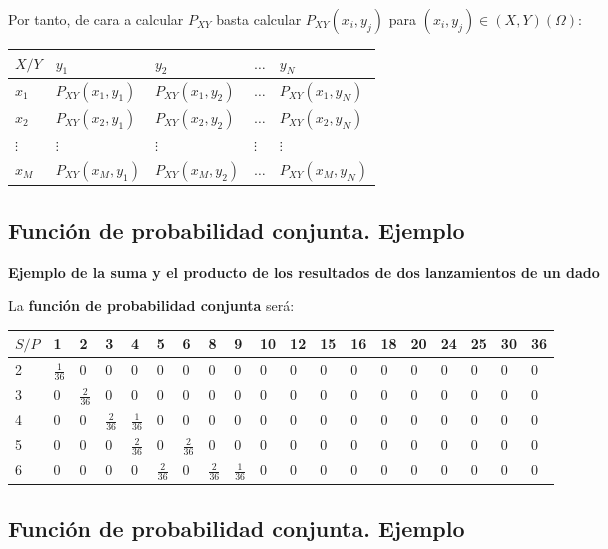 \documentclass[]{book}
\begin{document}
Por tanto, de cara a calcular \(P_{XY}\) basta calcular \(P_{XY}(x_i,y_j)\) para \((x_i,y_j)\in (X,Y)(\Omega)\):

\begin{longtable}[]{@{}lllll@{}}
\toprule
\(X/Y\) & \(y_1\) & \(y_2\) & \(\ldots\) & \(y_N\)\tabularnewline
\midrule
\endhead
\(x_1\) & \(P_{XY}(x_1,y_1)\) & \(P_{XY}(x_1,y_2)\) & \(\ldots\) & \(P_{XY}(x_1,y_N)\)\tabularnewline
\(x_2\) & \(P_{XY}(x_2,y_1)\) & \(P_{XY}(x_2,y_2)\) & \(\ldots\) & \(P_{XY}(x_2,y_N)\)\tabularnewline
\(\vdots\) & \(\vdots\) & \(\vdots\) & \(\vdots\) & \(\vdots\)\tabularnewline
\(x_M\) & \(P_{XY}(x_M,y_1)\) & \(P_{XY}(x_M,y_2)\) & \(\ldots\) & \(P_{XY}(x_M,y_N)\)\tabularnewline
\bottomrule
\end{longtable}

\hypertarget{funciuxf3n-de-probabilidad-conjunta.-ejemplo}{%
\subsection{Función de probabilidad conjunta. Ejemplo}\label{funciuxf3n-de-probabilidad-conjunta.-ejemplo}}

\textbf{Ejemplo de la suma y el producto de los resultados de dos lanzamientos de un dado}

La \textbf{función de probabilidad conjunta} será:

\begin{longtable}[]{@{}lllllllllllllllllll@{}}
\toprule
\(S/P\) & 1 & 2 & 3 & 4 & 5 & 6 & 8 & 9 & 10 & 12 & 15 & 16 & 18 & 20 & 24 & 25 & 30 & 36\tabularnewline
\midrule
\endhead
2 & \(\frac{1}{36}\) & 0 & 0 & 0 & 0 & 0 & 0 & 0 & 0 & 0 & 0 & 0 & 0 & 0 & 0 & 0 & 0 & 0\tabularnewline
3 & 0 & \(\frac{2}{36}\) & 0 & 0 & 0 & 0 & 0 & 0 & 0 & 0 & 0 & 0 & 0 & 0 & 0 & 0 & 0 & 0\tabularnewline
4 & 0 & 0 & \(\frac{2}{36}\) & \(\frac{1}{36}\) & 0 & 0 & 0 & 0 & 0 & 0 & 0 & 0 & 0 & 0 & 0 & 0 & 0 & 0\tabularnewline
5 & 0 & 0 & 0 & \(\frac{2}{36}\) & 0 & \(\frac{2}{36}\) & 0 & 0 & 0 & 0 & 0 & 0 & 0 & 0 & 0 & 0 & 0 & 0\tabularnewline
6 & 0 & 0 & 0 & 0 & \(\frac{2}{36}\) & 0 & \(\frac{2}{36}\) & \(\frac{1}{36}\) & 0 & 0 & 0 & 0 & 0 & 0 & 0 & 0 & 0 & 0\tabularnewline
\bottomrule
\end{longtable}

\hypertarget{funciuxf3n-de-probabilidad-conjunta.-ejemplo-1}{%
\subsection{Función de probabilidad conjunta. Ejemplo}\label{funciuxf3n-de-probabilidad-conjunta.-ejemplo-1}}
\end{document}

